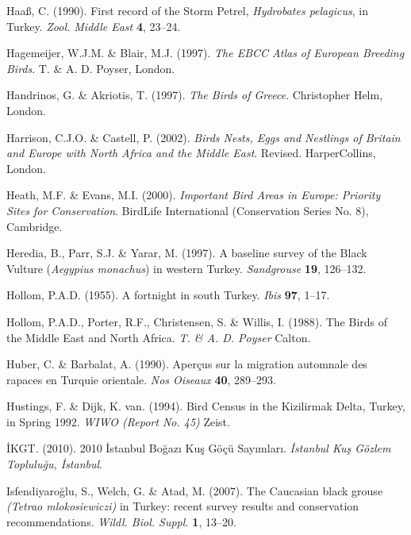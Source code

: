 \documentclass[
  a4paper,
  DIV=11,
  numbers=noendperiod]{scrreprt}
\newlength{\cslhangindent}
\newenvironment{CSLReferences}[2] %
 {\begin{list}{}{%
  \setlength{\itemindent}{0pt}
  \setlength{\leftmargin}{0pt}
  \setlength{\parsep}{0pt}
  \ifodd #1
   \setlength{\leftmargin}{\cslhangindent}
   \setlength{\itemindent}{-1\cslhangindent}
  \fi
  \setlength{\itemsep}{#2\baselineskip}}}
 {\end{list}}
\begin{document}
\begin{CSLReferences}{1}{1}
Haaß, C. (1990). {First record of the Storm Petrel, \emph{Hydrobates
pelagicus}, in Turkey}. \emph{Zool. Middle East} \textbf{4}, 23--24.

Hagemeijer, W.J.M. \& Blair, M.J. (1997). \emph{{The EBCC Atlas of
European Breeding Birds}}. T. \& A. D. Poyser, London.

Handrinos, G. \& Akriotis, T. (1997). \emph{{The Birds of Greece}}.
Christopher Helm, London.

Harrison, C.J.O. \& Castell, P. (2002). \emph{{Birds Nests, Eggs and
Nestlings of Britain and Europe with North Africa and the Middle East}}.
Revised. HarperCollins, London.

Heath, M.F. \& Evans, M.I. (2000). \emph{{Important Bird Areas in
Europe: Priority Sites for Conservation}}. BirdLife International
(Conservation Series No. 8), Cambridge.

Heredia, B., Parr, S.J. \& Yarar, M. (1997). {A baseline survey of the
Black Vulture (\emph{Aegypius monachus}) in western Turkey}.
\emph{Sandgrouse} \textbf{19}, 126--132.

Hollom, P.A.D. (1955). {A fortnight in south Turkey}. \emph{Ibis}
\textbf{97}, 1--17.

Hollom, P.A.D., Porter, R.F., Christensen, S. \& Willis, I. (1988). {The
Birds of the Middle East and North Africa}. \emph{T. \& A. D. Poyser}
Calton.

Huber, C. \& Barbalat, A. (1990). {Aperçus sur la migration automnale
des rapaces en Turquie orientale}. \emph{Nos Oiseaux} \textbf{40},
289--293.

Hustings, F. \& Dijk, K. van. (1994). {Bird Census in the Kizilirmak
Delta, Turkey, in Spring 1992}. \emph{WIWO (Report No. 45)} Zeist.

İKGT. (2010). {2010 İstanbul Boğazı Kuş Göçü Sayımları}. \emph{İstanbul
Kuş Gözlem Topluluğu, İstanbul}.

Isfendiyaroğlu, S., Welch, G. \& Atad, M. (2007). {The Caucasian black
grouse \emph{(Tetrao mlokosiewiczi)} in Turkey: recent survey results
and conservation recommendations}. \emph{Wildl. Biol. Suppl.}
\textbf{1}, 13--20.


\end{CSLReferences}
\end{document}
